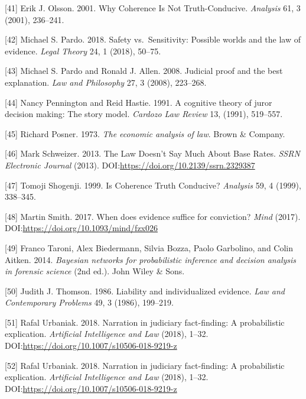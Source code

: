 \documentclass[11pt,dvipsnames,enabledeprecatedfontcommands]{scrartcl}
\begin{document}
\hypertarget{ref-olsson2001}{}
{[}41{]} Erik J. Olsson. 2001. Why Coherence Is Not Truth-Conducive.
\emph{Analysis} 61, 3 (2001), 236--241.

\hypertarget{ref-pardo2018}{}
{[}42{]} Michael S. Pardo. 2018. Safety vs.~Sensitivity: Possible worlds
and the law of evidence. \emph{Legal Theory} 24, 1 (2018), 50--75.

\hypertarget{ref-Pardo2008judicial}{}
{[}43{]} Michael S. Pardo and Ronald J. Allen. 2008. Judicial proof and
the best explanation. \emph{Law and Philosophy} 27, 3 (2008), 223--268.

\hypertarget{ref-Pennington1991}{}
{[}44{]} Nancy Pennington and Reid Hastie. 1991. A cognitive theory of
juror decision making: The story model. \emph{Cardozo Law Review} 13,
(1991), 519--557.

\hypertarget{ref-Posner1973}{}
{[}45{]} Richard Posner. 1973. \emph{The economic analysis of law}.
Brown \& Company.

\hypertarget{ref-schweizer2013LawDoesnSay}{}
{[}46{]} Mark Schweizer. 2013. The Law Doesn't Say Much About Base
Rates. \emph{SSRN Electronic Journal} (2013).
DOI:\url{https://doi.org/10.2139/ssrn.2329387}

\hypertarget{ref-shogenji1999}{}
{[}47{]} Tomoji Shogenji. 1999. Is Coherence Truth Conducive?
\emph{Analysis} 59, 4 (1999), 338--345.

\hypertarget{ref-Smith_conviction_mind_2017}{}
{[}48{]} Martin Smith. 2017. When does evidence suffice for conviction?
\emph{Mind} (2017). DOI:\url{https://doi.org/10.1093/mind/fzx026}

\hypertarget{ref-taroni2006bayesian}{}
{[}49{]} Franco Taroni, Alex Biedermann, Silvia Bozza, Paolo Garbolino,
and Colin Aitken. 2014. \emph{Bayesian networks for probabilistic
inference and decision analysis in forensic science} (2nd ed.). John
Wiley \& Sons.

\hypertarget{ref-Thomson86}{}
{[}50{]} Judith J. Thomson. 1986. Liability and individualized evidence.
\emph{Law and Contemporary Problems} 49, 3 (1986), 199--219.

\hypertarget{ref-urbaniak2018narration}{}
{[}51{]} Rafal Urbaniak. 2018. Narration in judiciary fact-finding: A
probabilistic explication. \emph{Artificial Intelligence and Law}
(2018), 1--32. DOI:\url{https://doi.org/10.1007/s10506-018-9219-z}

\hypertarget{ref-Urbaniak2017Narration-in-ju}{}
{[}52{]} Rafal Urbaniak. 2018. Narration in judiciary fact-finding: A
probabilistic explication. \emph{Artificial Intelligence and Law}
(2018), 1--32. DOI:\url{https://doi.org/10.1007/s10506-018-9219-z}
\end{document}
